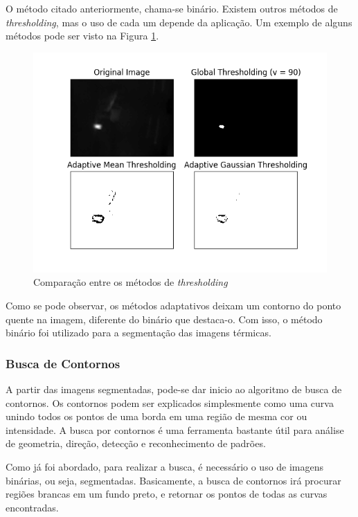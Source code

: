 		O método citado anteriormente, chama-se binário. Existem outros métodos de \textit{thresholding}, mas o uso de cada um depende da aplicação. Um exemplo de alguns métodos pode ser visto na Figura \ref{fig:thresh}.
		
		\begin{figure}[!ht]
		   \centering
		   \includegraphics[width=16cm]{Figures/thresh.png}
		   \caption{Comparação entre os métodos de \textit{thresholding}}
		   \label{fig:thresh}
		\end{figure}
		
		Como se pode observar, os métodos adaptativos deixam um contorno do ponto quente na imagem, diferente do binário que destaca-o. Com isso, o método binário foi utilizado para a segmentação das imagens térmicas.
		
		
		\subsubsection{Busca de Contornos}
		
		A partir das imagens segmentadas, pode-se dar inicio ao algoritmo de busca de contornos. Os contornos podem ser explicados simplesmente como uma curva unindo todos os pontos de uma borda em uma região de mesma cor ou intensidade. A busca por contornos é uma ferramenta bastante útil para análise de geometria, direção, detecção e reconhecimento de padrões.
		
		Como já foi abordado, para realizar a busca, é necessário o uso de imagens binárias, ou seja, segmentadas. Basicamente, a busca de contornos irá procurar regiões brancas em um fundo preto, e retornar os pontos de todas as curvas encontradas.
		

